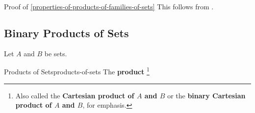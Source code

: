 \begin{Proof}{Proof of \cref{properties-of-products-of-families-of-sets}}%
    This follows from .
\end{Proof}
\subsection{Binary Products of Sets}\label{subsection-binary-products-of-sets}
Let $A$ and $B$ be sets.%
\begin{definition}{Products of Sets}{products-of-sets}%
    The \textbf{product}%
    \footnote{%
        Also called the \textbf{Cartesian product of $A$ and $B$} or the \textbf{binary Cartesian product of $A$ and $B$}, for emphasis.

}
\end{definition}
